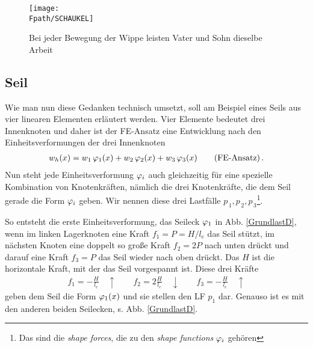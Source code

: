 \begin{figure}[tbp] \centering
\if {} \sidecaption \fi
\texttt{[image: \\Fpath/SCHAUKEL]}
\caption{Bei jeder Bewegung der Wippe leisten Vater und Sohn dieselbe Arbeit}
\label{Schaukel}
\end{figure}%

\vspace{-0.5cm}
{\textcolor{sectionTitleBlue}{\section{Seil}}}\label{Seil}
Wie man nun diese Gedanken technisch umsetzt, soll am Beispiel eines Seils aus vier linearen Elementen erl\"{a}utert werden. Vier Elemente bedeutet drei Innenknoten und daher ist der FE-Ansatz eine Entwicklung nach den Einheitsverformungen der drei Innenknoten
\begin{align}
 w_{h}(x) = w_1\,\varphi_1(x) + w_2\, \varphi_2(x) + w_3 \,\varphi_3(x) \qquad \mbox{(FE-Ansatz)} \,.
\end{align}
Nun steht jede Einheitsverformung $\varphi_i$ auch gleichzeitig f\"{u}r eine spezielle Kombination von Knotenkr\"{a}ften, n\"{a}mlich die drei Knotenkr\"{a}fte, die  dem Seil gerade die Form $\varphi_i$ geben. Wir nennen diese drei Lastf\"{a}lle $p_{\,1}, p_{\,2}, p_{\,3}$\footnote{Das sind die {\em shape forces\/}, die zu den {\em shape functions\/} $\varphi_i$ geh\"{o}ren}.


So entsteht die erste Einheitsverformung, das Seileck $\varphi_1$ in Abb. \ref{GrundlastD}, wenn im linken Lagerknoten eine Kraft $f_1 = P = H/l_e$ das Seil st\"{u}tzt, im n\"{a}chsten Knoten eine doppelt so gro{\ss}e Kraft $f_2 = 2 P$ nach unten dr\"{u}ckt und darauf eine Kraft $f_3 =  P$ das Seil wieder nach oben dr\"{u}ckt. Das $H$ ist die horizontale Kraft, mit der das Seil vorgespannt ist. Diese drei Kr\"{a}fte
\begin{align}
 f_1 = - \frac{H}{l_e} \quad \uparrow  \qquad f_2 = 2 \frac{H}{l_e}\quad \downarrow \qquad f_3 = - \frac{H}{l_e} \quad \uparrow
\end{align}
geben dem Seil die Form $\varphi_1(x)$ und sie stellen den LF $p_1$ dar. Genauso ist es mit den anderen beiden Seilecken, s. Abb. \ref{GrundlastD}.

